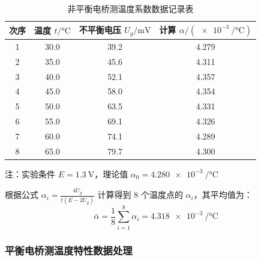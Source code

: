 \documentclass{../../templates/Report}%
\begin{document}
\begin{fullreportonly}
    \begin{table}[H]
        \centering
        \caption{非平衡电桥测温度系数数据记录表}
        \label{tab:non_equilibrium}
        \begin{tabular}{cccc}
            \toprule
            次序 & 温度 $t / \si{\degreeCelsius}$ & 不平衡电压 $U_g / \si{\milli\volt}$ & 计算 $\alpha / (\SI{e-3}{\per\degreeCelsius})$ \\
            \midrule
            1  & 30.0                         & 39.2                           & 4.279                                        \\
            2  & 35.0                         & 45.6                           & 4.311                                        \\
            3  & 40.0                         & 52.1                           & 4.357                                        \\
            4  & 45.0                         & 58.0                           & 4.354                                        \\
            5  & 50.0                         & 63.5                           & 4.331                                        \\
            6  & 55.0                         & 69.1                           & 4.326                                        \\
            7  & 60.0                         & 74.1                           & 4.289                                        \\
            8  & 65.0                         & 79.7                           & 4.300                                        \\
            \bottomrule
        \end{tabular}
        \par\vspace{1mm}
        {\footnotesize * 注：实验条件 $E = \SI{1.3}{\volt}$，理论值 $\alpha_{0} = \SI{4.280e-3}{\per\degreeCelsius}$}
    \end{table}

    根据公式 $\alpha_i = \frac{4U_g}{t(E-2U_g)}$ 计算得到 8 个温度点的 $\alpha_i$，其平均值为：
    \begin{equation}
        \bar{\alpha} = \frac{1}{8}\sum_{i=1}^{8}\alpha_i = \SI{4.318e-3}{\per\degreeCelsius}
    \end{equation}

    \subsubsection{平衡电桥测温度特性数据处理}


\end{fullreportonly}
\end{document}
